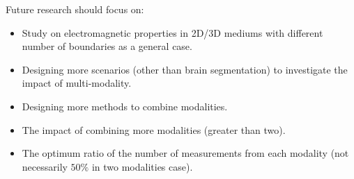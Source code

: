 Future research should focus on:
\begin{itemize}
\item Study on electromagnetic properties in 2D/3D mediums with different number of boundaries as a general case.
\item Designing more scenarios (other than brain segmentation) to investigate the impact of multi-modality.
\item Designing more methods to combine modalities.
\item The impact of combining more modalities (greater than two).
\item The optimum ratio of the number of measurements from each modality (not necessarily $50\%$ in two modalities case).
\end{itemize} 
